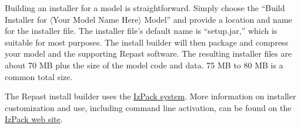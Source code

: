 \documentclass[11pt]{amsart}
\begin{document}
Building an installer for a model is straightforward. Simply choose the ``Build Installer for $\langle$Your Model Name Here$\rangle$ Model'' and provide a location and name for the installer file. The installer file's default name is ``setup.jar,'' which is suitable for most purposes. The install builder will then package and compress your model and the supporting Repast software. The resulting installer files are about 70 MB plus the size of the model code and data. 75 MB to 80 MB is a common total size.

The Repast install builder uses the \href{http://izpack.org/}{IzPack system}.  More information on installer customization and use, including command line activation, can be found on the  \href{http://izpack.org/}{IzPack web site}.

\noindent\begin{minipage}[h]{\textwidth}
\vspace{.2in}
\lstset{language=java,caption=}
\begin{lstlisting}

\end{lstlisting}
\vspace{.2in}
\end{minipage}
\end{document}
